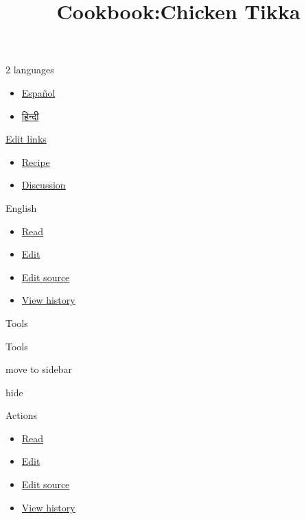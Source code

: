 \documentclass[11pt,a4paper]{article}
\title{Cookbook:Chicken Tikka}
\begin{document}
\maketitle

2 languages

\begin{itemize}
\item \href{https://es.wikibooks.org/wiki/Artes\_culinarias/Recetas/Pollo\_tikka}{Español}
\item \href{https://hi.wikibooks.org/wiki/\%E0\%A4\%B0\%E0\%A4\%B8\%E0\%A5\%8B\%E0\%A4\%88:\%E0\%A4\%9A\%E0\%A4\%BF\%E0\%A4\%95\%E0\%A4\%A8\_\%E0\%A4\%9F\%E0\%A4\%BF\%E0\%A4\%95\%E0\%A5\%8D\%E0\%A4\%95\%E0\%A4\%BE}{हिन्दी}
\end{itemize}

\href{https://www.wikidata.org/wiki/Special:EntityPage/Q2548408\#sitelinks-wikibooks}{Edit links}

\begin{itemize}
\item \href{https://en.wikibooks.org/wiki/Cookbook:Chicken\_Tikka}{Recipe}
\item \href{https://en.wikibooks.org/wiki/Cookbook\_talk:Chicken\_Tikka}{Discussion}
\end{itemize}

English

\begin{itemize}
\item \href{https://en.wikibooks.org/wiki/Cookbook:Chicken\_Tikka}{Read}
\item \href{https://en.wikibooks.org/w/index.php?title=Cookbook:Chicken\_Tikka\&veaction=edit}{Edit}
\item \href{https://en.wikibooks.org/w/index.php?title=Cookbook:Chicken\_Tikka\&action=edit}{Edit source}
\item \href{https://en.wikibooks.org/w/index.php?title=Cookbook:Chicken\_Tikka\&action=history}{View history}
\end{itemize}

Tools

Tools

move to sidebar

hide

Actions

\begin{itemize}
\item \href{https://en.wikibooks.org/wiki/Cookbook:Chicken\_Tikka}{Read}
\item \href{https://en.wikibooks.org/w/index.php?title=Cookbook:Chicken\_Tikka\&veaction=edit}{Edit}
\item \href{https://en.wikibooks.org/w/index.php?title=Cookbook:Chicken\_Tikka\&action=edit}{Edit source}
\item \href{https://en.wikibooks.org/w/index.php?title=Cookbook:Chicken\_Tikka\&action=history}{View history}
\end{itemize}
\end{document}
